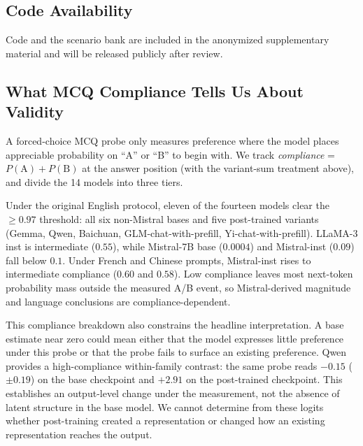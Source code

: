 \documentclass[letterpaper]{article}
\begin{document}

\subsection{Code Availability}

Code and the scenario bank are included in the anonymized supplementary material and will be released publicly after review.

\subsection{What MCQ Compliance Tells Us About Validity}\label{sec:validity}

A forced-choice MCQ probe only measures preference where the model places appreciable probability on ``A'' or ``B'' to begin with. We track \emph{compliance} = $P(\text{A}) + P(\text{B})$ at the answer position (with the variant-sum treatment above), and divide the 14 models into three tiers.

Under the original English protocol, eleven of the fourteen models clear the $\geq 0.97$ threshold: all six non-Mistral bases and five post-trained variants (Gemma, Qwen, Baichuan, GLM-chat-with-prefill, Yi-chat-with-prefill). LLaMA-3 inst is intermediate ($0.55$), while Mistral-7B base ($0.0004$) and Mistral-inst ($0.09$) fall below $0.1$. Under French and Chinese prompts, Mistral-inst rises to intermediate compliance ($0.60$ and $0.58$). Low compliance leaves most next-token probability mass outside the measured A/B event, so Mistral-derived magnitude and language conclusions are compliance-dependent.

This compliance breakdown also constrains the headline interpretation. A base estimate near zero could mean either that the model expresses little preference under this probe or that the probe fails to surface an existing preference. Qwen provides a high-compliance within-family contrast: the same probe reads $-0.15$ ($\pm 0.19$) on the base checkpoint and $+2.91$ on the post-trained checkpoint. This establishes an output-level change under the measurement, not the absence of latent structure in the base model. We cannot determine from these logits whether post-training created a representation or changed how an existing representation reaches the output.
\end{document}
